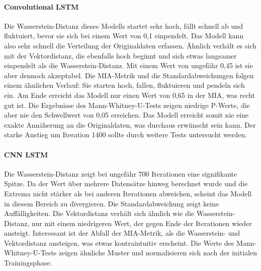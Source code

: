 \paragraph{\textbf{Convolutional LSTM}}
Die Wasserstein-Distanz dieses Modells startet sehr hoch, fällt schnell ab und fluktuiert, bevor sie sich bei einem Wert von 0,1 einpendelt. Das Modell kann also sehr schnell die Verteilung der Originaldaten erfassen.
Ähnlich verhält es sich mit der Vektordistanz, die ebenfalls hoch beginnt und sich etwas langsamer einpendelt als die Wasserstein-Distanz. Mit einem Wert von ungefähr 0,45 ist sie aber dennoch akzeptabel.
Die \ac{MIA}-Metrik und die Standardabweichungen folgen einem ähnlichen Verlauf: Sie starten hoch, fallen, fluktuieren und pendeln sich ein. Am Ende erreicht das Modell nur einen Wert von 0,65 in der \ac{MIA},
was recht gut ist. Die Ergebnisse des Mann-Whitney-U-Tests zeigen niedrige P-Werte, die aber nie den Schwellwert von 0,05 erreichen. Das Modell erreicht somit nie eine exakte Annäherung an die Originaldaten,
was durchaus erwünscht sein kann. Der starke Anstieg um Iteration 1400 sollte durch weitere Tests untersucht werden.

\paragraph{\textbf{CNN LSTM}}
Die Wasserstein-Distanz zeigt bei ungefähr 700 Iterationen eine signifikante Spitze. Da der Wert über mehrere Datensätze hinweg berechnet wurde und die Extrema nicht stärker als bei anderen Iterationen abweichen,
scheint das Modell in diesem Bereich zu divergieren. Die Standardabweichung zeigt keine Auffälligkeiten. Die Vektordistanz verhält sich ähnlich wie die Wasserstein-Distanz, nur mit einem niedrigeren Wert, der gegen Ende
der Iterationen wieder ansteigt. Interessant ist der Abfall der \ac{MIA}-Metrik, als die Wasserstein- und Vektordistanz ansteigen, was etwas kontraintuitiv erscheint. Die Werte des Mann-Whitney-U-Tests zeigen ähnliche Muster
und normalisieren sich nach der initialen Trainingsphase.

